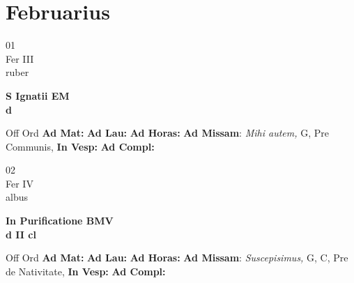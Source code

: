\documentclass[10pt, openany]{book}
\begin{document}
        \chapter{Februarius}
                        
        \begin{center}
            \begin{minipage}{3.5in}
                \vspace{2em}
                \begin{minipage}{0.5in}
                    {\Huge 01} \\
                    {\normalsize Fer III} \\
                    {\normalsize ruber}
                \end{minipage}
                \begin{minipage}{3.0in}
                    \textbf{ \large S Ignatii EM \\
                    \textnormal{\normalsize d}} \\ 
                \end{minipage}
                \begin{justify}Off Ord
                    \textbf{Ad Mat: }
                    \textbf{Ad Lau: }
                    \textbf{Ad Horas: }\textbf{Ad Missam}: \textit{Mihi autem,} G, Pre Communis,  
                    \textbf{In Vesp: }
                    \textbf{Ad Compl: }
                \end{justify}
            \end{minipage}
        \end{center}
    
        \begin{center}
            \begin{minipage}{3.5in}
                \vspace{2em}
                \begin{minipage}{0.5in}
                    {\Huge 02} \\
                    {\normalsize Fer IV} \\
                    {\normalsize albus}
                \end{minipage}
                \begin{minipage}{3.0in}
                    \textbf{ \large In Purificatione BMV \\
                    \textnormal{\normalsize d II cl}} \\ 
                \end{minipage}
                \begin{justify}Off Ord
                    \textbf{Ad Mat: }
                    \textbf{Ad Lau: }
                    \textbf{Ad Horas: }\textbf{Ad Missam}: \textit{Suscepisimus,} G, C, Pre de Nativitate,  
                    \textbf{In Vesp: }
                    \textbf{Ad Compl: }
                \end{justify}
            \end{minipage}
        \end{center}
    
\end{document}
